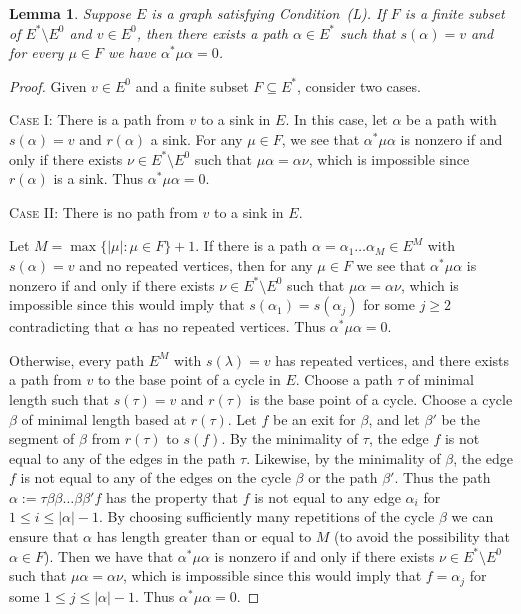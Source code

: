 \documentclass[11pt]{amsart}
\newtheorem{lemma}[theorem]{Lemma}
\theoremstyle{remark}
\numberwithin{equation}{section}
\begin{document}
\begin{lemma} \label{nonreturning-path-lemma}
Suppose $E$ is a graph satisfying Condition~(L).  If $F$ is a finite subset of $E^* \setminus E^0$ and $v \in E^0$, then there exists a path $\alpha \in E^*$ such that $s(\alpha)=v$ and for every $\mu \in F$ we have $\alpha^* \mu \alpha = 0$.
\end{lemma}

\begin{proof}
Given $v \in E^0$ and a finite subset $F \subseteq E^*$, consider two cases.

\noindent \textsc{Case I:} There is a path from $v$ to a sink in $E$.
In this case, let $\alpha$ be a path with $s(\alpha) = v$ and $r(\alpha)$ a sink.  For any $\mu \in F$, we see that $\alpha^* \mu \alpha$ is nonzero if and only if there exists $\nu \in E^* \setminus E^0$ such that $\mu \alpha = \alpha \nu$, which is impossible since $r(\alpha)$ is a sink.  Thus $\alpha^* \mu \alpha = 0$.

\noindent \textsc{Case II:} There is no path from $v$ to a sink in $E$.

Let $M = \max \{ | \mu | : \mu \in F \} + 1$.  If there is a path $\alpha = \alpha_1 \ldots \alpha_M \in E^M$ with $s(\alpha) = v$ and no repeated vertices, then for any $\mu \in F$ we see that $\alpha^* \mu \alpha$ is nonzero if and only if there exists $\nu \in E^* \setminus E^0$ such that $\mu \alpha = \alpha \nu$, which is impossible since this would imply that $s(\alpha_1) = s(\alpha_j)$ for some $j \geq 2$ contradicting that $\alpha$ has no repeated vertices.  Thus $\alpha^* \mu \alpha = 0$.

Otherwise, every path $E^M$ with $s(\lambda) = v$ has repeated vertices, and there exists a path from $v$ to the base point of a cycle in $E$.  Choose a path $\tau$ of minimal length such that $s(\tau) = v$ and $r(\tau)$ is the base point of a cycle.  Choose a cycle $\beta$ of minimal length based at $r(\tau)$.  Let $f$ be an exit for $\beta$, and let $\beta'$ be the segment of $\beta$ from $r(\tau)$ to $s(f)$.  By the minimality of $\tau$, the edge $f$ is not equal to any of the edges in the path $\tau$.  Likewise, by the minimality of $\beta$, the edge $f$ is not equal to any of the edges on the cycle $\beta$ or the path $\beta'$.  Thus the path $\alpha := \tau \beta \beta \ldots \beta \beta' f$ has the property that $f$ is not equal to any edge $\alpha_i$ for $1 \leq i \leq |\alpha|-1$.  By choosing sufficiently many repetitions of the cycle $\beta$ we can ensure that $\alpha$ has length greater than or equal to $M$ (to avoid the possibility that $\alpha \in F$).  Then we have that $\alpha^* \mu \alpha$ is nonzero if and only if there exists $\nu \in E^* \setminus E^0$ such that $\mu \alpha = \alpha \nu$, which is impossible since this would imply that $f = \alpha_j$ for some $1 \leq j \leq |\alpha|-1$.  Thus $\alpha^* \mu \alpha = 0$.
\end{proof}
\end{document}

